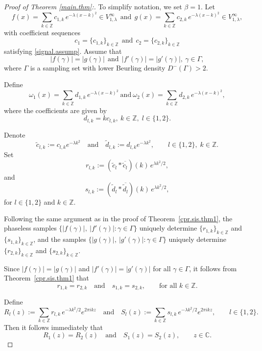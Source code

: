 \documentclass[11pt,oneside,reqno]{amsart}
\numberwithin{equation}{section}
\begin{document}
 \begin{proof}[ Proof of Theorem \ref{main.thm}:]  
To simplify notation, we set $\beta = 1$. Let
\[
f(x)=\sum_{k\in \mathbb{Z}} c_{1,k}\, e^{-\lambda(x-k)^2} \in V^\infty_{1, \lambda}
\ \ \text{and} \ \ 
g(x)=\sum_{k\in \mathbb{Z}} c_{2,k}\, e^{-\lambda(x-k)^2} \in V^\infty_{1, \lambda}, 
\]
with coefficient sequences
\[
c_1=\{c_{1,k}\}_{k\in \mathbb{Z}}
\ \  \text{and} \ \ 
c_2=\{c_{2,k}\}_{k\in \mathbb{Z}}
\]
satisfying \eqref{signal.assump}. Assume that
\[
|f(\gamma)| = |g(\gamma)| \ \ \text{and} \ \ 
|f'(\gamma)| = |g'(\gamma)|, \ \gamma \in \Gamma,
\]
where $\Gamma$ is a sampling set with lower Beurling density $D^{-}(\Gamma) > 2$.

Define
\[
\omega_1(x)=\sum_{k\in \mathbb{Z}} d_{1,k}\, e^{-\lambda(x-k)^2}
\ \text{and} \
\omega_2(x)=\sum_{k\in \mathbb{Z}} d_{2,k}\, e^{-\lambda(x-k)^2},
\]
where the coefficients are given by
\[
d_{l,k} = kc_{l,k}, \ k\in \mathbb{Z}, \; l\in \{1,2\}.
\]

Denote
\[
\tilde{c}_{l,k} := c_{l,k} e^{-\lambda k^{2}}
\quad \text{and} \quad
\tilde{d}_{l,k} := d_{l,k} e^{-\lambda k^{2}},
\qquad l\in\{1,2\}, \; k\in\mathbb{Z}.
\]
Set
\begin{equation}\label{coeff.eq.1}
r_{l,k}
:= (\tilde c_l \ast \overline{\tilde c_l})(k)\, e^{\lambda k^{2}/2},
\end{equation}
and
\begin{equation}\label{coeff.eq.2}
s_{l,k}
:= (\tilde d_l \ast \overline{\tilde d_l})(k)\, e^{\lambda k^{2}/2},
\end{equation}
for $l\in\{1,2\}$ and $k\in\mathbb{Z}$.

Following  the same argument as in the proof of Theorem~\ref{cpr.sis.thm1}, the phaseless
samples $\{|f(\gamma)|,\ |f'(\gamma)|: \gamma \in \Gamma\}$ uniquely determine
$\{r_{1,k}\}_{k\in\mathbb{Z}}$ and $\{s_{1,k}\}_{k\in\mathbb{Z}}$, and the samples
$\{|g(\gamma)|, \ |g'(\gamma)|: \gamma \in \Gamma\}$ uniquely determine
$\{r_{2,k}\}_{k\in\mathbb{Z}}$ and $\{s_{2,k}\}_{k\in\mathbb{Z}}$.

Since $|f(\gamma)| = |g(\gamma)|$ and $|f'(\gamma)| = |g'(\gamma)|$ for all
$\gamma \in \Gamma$, it follows from Theorem~\ref{cpr.sis.thm1} that
\[
r_{1,k} = r_{2,k}
\quad \text{and} \quad
s_{1,k} = s_{2,k},
\qquad \text{for all } k \in \mathbb{Z}.
\]

Define
\[
R_l(z) := \sum_{k\in\mathbb{Z}} r_{l,k}\, e^{-\lambda k^{2}/2} e^{2\pi i k z}
\quad \text{and} \quad
S_l(z) := \sum_{k\in\mathbb{Z}} s_{l,k}\, e^{-\lambda k^{2}/2} e^{2\pi i k z},
\qquad l\in\{1,2\}.
\]
Then it follows immediately that
\begin{equation}\label{coeff.eq.3}
R_1(z) = R_2(z)
\quad \text{and} \quad
S_1(z) = S_2(z),
\qquad z \in \mathbb{C}.
\end{equation}



\end{proof}
\end{document}
